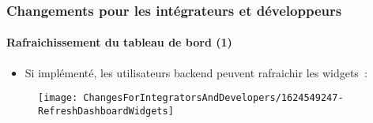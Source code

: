 %

\begin{frame}[fragile]
	\frametitle{Changements pour les intégrateurs et développeurs}
	\framesubtitle{Rafraichissement du tableau de bord (1)}


	\begin{itemize}
		\item Si implémenté, les utilisateurs backend peuvent rafraichir les widgets~:
	\end{itemize}

	\begin{figure}
		\texttt{[image: ChangesForIntegratorsAndDevelopers/1624549247-RefreshDashboardWidgets]}
	\end{figure}

\end{frame}

